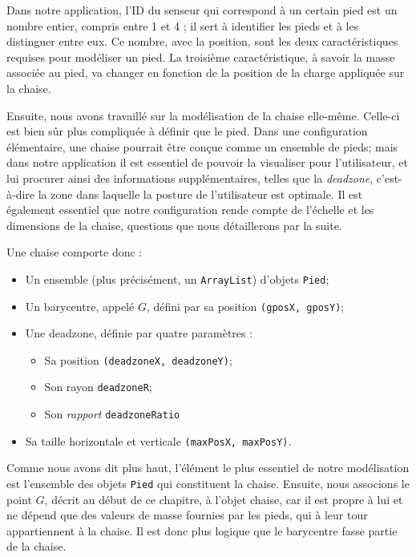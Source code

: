 \documentclass{polytech/polytech}
\begin{document}
Dans notre application, l'ID du senseur qui correspond à un certain pied est un nombre entier, compris entre 1 et 4 ; il sert à identifier les pieds et à les distinguer entre eux. Ce nombre, avec la position, sont les deux caractéristiques requises pour modéliser un pied. La troisième caractéristique, à savoir la masse associée au pied, va changer en fonction de la position de la charge appliquée sur la chaise.

Ensuite, nous avons travaillé sur la modélisation de la chaise elle-même. Celle-ci est bien sûr plus compliquée à définir que le pied. Dans une configuration élémentaire, une chaise pourrait être conçue comme un ensemble de pieds; mais dans notre application il est essentiel de pouvoir la visualiser pour l'utilisateur, et lui procurer ainsi des informations supplémentaires, telles que la \textit{deadzone}, c'est-à-dire la zone dans laquelle la posture de l'utilisateur est optimale. Il est également essentiel que notre configuration rende compte de l'échelle et les dimensions de la chaise, questions que nous détaillerons par la suite.

Une chaise comporte donc :
\begin{itemize}
\item Un ensemble (plus précisément, un \texttt{ArrayList}) d’objets \texttt{Pied};
\item Un barycentre, appelé $G$, défini par sa position \texttt{(gposX, gposY)};
\item Une deadzone, définie par quatre paramètres :
\begin{itemize}
\item Sa position \texttt{(deadzoneX, deadzoneY)};
\item Son rayon \texttt{deadzoneR};
\item Son \textit{rapport} \texttt{deadzoneRatio}
\end{itemize}
\item Sa taille horizontale et verticale \texttt{(maxPosX, maxPosY)}.
\end{itemize}

Comme nous avons dit plus haut, l'élément le plus essentiel de notre modélisation est l'ensemble des objets \texttt{Pied} qui constituent la chaise. Ensuite, nous associons le point $G$, décrit au début de ce chapitre, à l'objet chaise, car il est propre à lui et ne dépend que des valeurs de masse fournies par les pieds, qui à leur tour appartiennent à la chaise. Il est donc plus logique que le barycentre fasse partie de la chaise.
\end{document}
